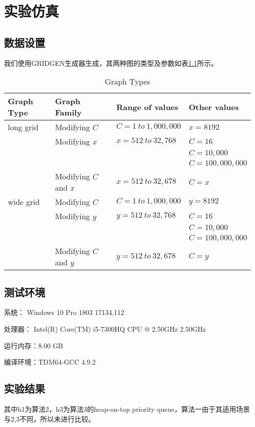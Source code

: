\chapter{实验仿真}
\section{数据设置}
我们使用GRIDGEN生成器\cite{Cherkassky1994Shortest}生成，其两种图的类型及参数如表\ref{tab1}所示。

\begin{table}[H]
  \caption{Graph Types}
  \label{tab1}
  \centering
  \begin{tabular}{p{2.4cm}<{\centering}|p{3.4cm}<{\centering}||p{3.4cm}<{\centering}|p{3.4cm}<{\centering}}
  \toprule
   Graph Type  & Graph Family & Range of values & Other values\\
  \midrule
  long grid & Modifying $C$ & $C=1\ to\ 1,000,000$ & $x=8192$\\
   & Modifying $x$ & $x=512\ to\ 32,768$ & $C=16$ \\
   & & & $C=10,000$\\
   & & & $C=100,000,000$\\
   & Modifying $C$ and $x$ & $x=512\ to\ 32,678$ & $C=x$\\
   \midrule
  wide grid & Modifying $C$ & $C=1\ to\ 1,000,000$ & $y=8192$\\
   & Modifying $y$ & $y=512\ to\ 32,768$ & $C=16$ \\
   & & & $C=10,000$\\
   & & & $C=100,000,000$\\
   & Modifying $C$ and $y$ & $y=512\ to\ 32,678$ & $C=y$\\
  \bottomrule
  \end{tabular} 
\end{table}


\section{测试环境}
系统：    Windows 10 Pro 1803 17134.112 \par
处理器：  Intel(R) Core(TM) i5-7300HQ CPU @ 2.50GHz 2.50GHz \par
运行内存：8.00 GB \par
编译环境：TDM64-GCC 4.9.2
\section{实验结果}
其中h1为算法2，h3为算法3的heap-on-top priority queue，算法一由于其适用场景与2,3不同，所以未进行比较。

